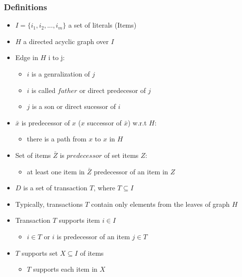 \documentclass[../notes.tex]{subfiles}
\begin{document}
\subsubsection{Definitions}
\begin{itemize}
  \item $I = \{i_1, i_2, ..., i_m\}$ a set of literals (Items)
  \item $H$ a directed acyclic graph over $I$
  \item Edge in $H$ i to j:

  \begin{itemize}
    \item $i$ is a genralization of $j$
    \item $i$ is called $father$ or direct predecesor of $j$
    \item $j$ is a son or direct sucessor of $i$
  \end{itemize}

  \item $\bar{x}$ is predecessor of $x$ ($x$ successor of $\bar{x}$) w.r.t $H$:
  \begin{itemize}
    \item there is a path from $x$ to $x$ in $H$
  \end{itemize}

  \item Set of items $\bar{Z}$ is $predecessor$ of set items $Z$:
  \begin{itemize}
    \item at least one item in $\bar{Z}$ predecessor of an item in $Z$
  \end{itemize}

  \item $D$ is a set of transaction $T$, where $T \subseteq I$
  \item Typically, transactions $T$ contain only elements from the leaves of graph $H$
  
  \item Transaction $T$ supports item $i \in I$
  \begin{itemize}
    \item $i \in T$ or $i$ is predecessor of an item $j \in T$
  \end{itemize}
  
  \item $T$ supports set $X \subseteq I$ of items
  \begin{itemize}
    \item $T$ supports each item in $X$
  \end{itemize}


\end{itemize}
\end{document}
